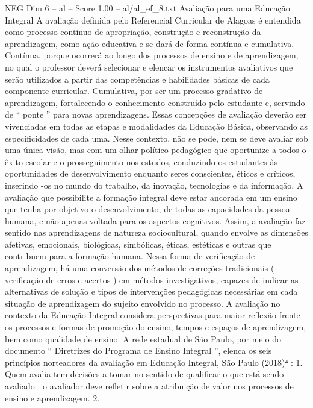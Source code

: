 \begin{textsample}{NEG Dim 6 – al – Score 1.00 – al/al\_ef\_8.txt}  \label{ex:f6_neg_065}
Avaliação para uma Educação Integral A avaliação definida pelo Referencial Curricular de Alagoas é entendida como processo contínuo de apropriação, construção e reconstrução da aprendizagem, como ação educativa e se dará de forma contínua e cumulativa.
Contínua, porque ocorrerá ao longo dos processos de ensino e de aprendizagem, no qual o professor deverá selecionar e elencar os instrumentos avaliativos que serão utilizados a partir das competências e habilidades básicas de cada componente curricular.
Cumulativa, por ser um processo gradativo de aprendizagem, fortalecendo o conhecimento construído pelo estudante e, servindo de “ ponte ” para novas aprendizagens.
Essas concepções de avaliação deverão ser vivenciadas em todas as etapas e modalidades da Educação Básica, observando as especificidades de cada uma.
Nesse contexto, não se pode, nem se deve avaliar sob uma única visão, mas com um olhar político-pedagógico que oportunize a todos o êxito escolar e o prosseguimento nos estudos, conduzindo os estudantes às oportunidades de desenvolvimento enquanto seres conscientes, éticos e críticos, inserindo -os no mundo do trabalho, da inovação, tecnologias e da informação.
A avaliação que possibilite a formação integral deve estar ancorada em um ensino que tenha por objetivo o desenvolvimento, de todas as capacidades da pessoa humana, e não apenas voltada para os aspectos cognitivos.
Assim, a avaliação faz sentido nas aprendizagens de natureza sociocultural, quando envolve as dimensões afetivas, emocionais, biológicas, simbólicas, éticas, estéticas e outras que contribuem para a formação humana.
Nessa forma de verificação de aprendizagem, há uma conversão dos métodos de correções tradicionais ( verificação de erros e acertos ) em métodos investigativos, capazes de indicar as alternativas de solução e tipos de intervenções pedagógicas necessárias em cada situação de aprendizagem do sujeito envolvido no processo.
A avaliação no contexto da Educação Integral considera perspectivas para maior reflexão frente os processos e formas de promoção do ensino, tempos e espaços de aprendizagem, bem como qualidade de ensino.
A rede estadual de São Paulo, por meio do documento “ Diretrizes do Programa de Ensino Integral ”, elenca os seis princípios norteadores da avaliação em Educação Integral, São Paulo (2018)⁴ : 1.
Quem avalia tem decisões a tomar no sentido de qualificar o que está sendo avaliado : o avaliador deve refletir sobre a atribuição de valor nos processos de ensino e aprendizagem. 2.

\end{textsample}
